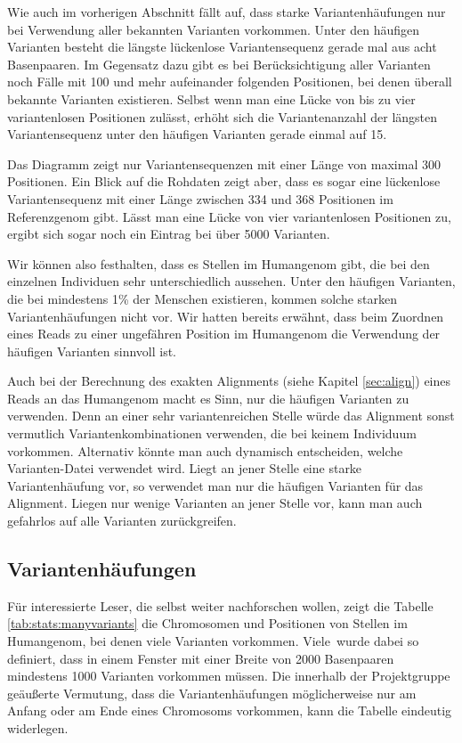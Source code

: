 Wie auch im vorherigen Abschnitt fällt auf, dass starke Variantenhäufungen nur bei Verwendung aller bekannten Varianten vorkommen. Unter den häufigen Varianten besteht die längste lückenlose Variantensequenz gerade mal aus acht Basenpaaren. Im Gegensatz dazu gibt es bei Berücksichtigung aller Varianten noch Fälle mit 100 und mehr aufeinander folgenden Positionen, bei denen überall bekannte Varianten existieren. Selbst wenn man eine Lücke von bis zu vier variantenlosen Positionen zulässt, erhöht sich die Variantenanzahl der längsten Variantensequenz unter den häufigen Varianten gerade einmal auf 15. 

Das Diagramm zeigt nur Variantensequenzen mit einer Länge von maximal 300 Positionen. Ein Blick auf die Rohdaten zeigt aber, dass es sogar eine lückenlose Variantensequenz mit einer Länge zwischen 334 und 368 Positionen im Referenzgenom gibt. Lässt man eine Lücke von vier variantenlosen Positionen zu, ergibt sich sogar noch ein Eintrag bei über 5000 Varianten. 

Wir können also festhalten, dass es Stellen im Humangenom gibt, die bei den einzelnen Individuen sehr unterschiedlich aussehen. Unter den häufigen Varianten, die bei mindestens 1\% der Menschen existieren, kommen solche starken Variantenhäufungen nicht vor. Wir hatten bereits erwähnt, dass beim Zuordnen eines Reads zu einer ungefähren Position im Humangenom die Verwendung der häufigen Varianten sinnvoll ist. 

Auch bei der Berechnung des exakten Alignments (siehe Kapitel \ref{sec:align}) eines Reads an das Humangenom macht es Sinn, nur die häufigen Varianten zu verwenden. Denn an einer sehr variantenreichen Stelle würde das Alignment sonst vermutlich Variantenkombinationen verwenden, die bei keinem Individuum vorkommen. Alternativ könnte man auch dynamisch entscheiden, welche Varianten-Datei verwendet wird. Liegt an jener Stelle eine starke Variantenhäufung vor, so verwendet man nur die häufigen Varianten für das Alignment. Liegen nur wenige Varianten an jener Stelle vor, kann man auch gefahrlos auf alle Varianten zurückgreifen.

\subsection{Variantenhäufungen}
\label{sec:stats:res:manyvariants}

Für interessierte Leser, die selbst weiter nachforschen wollen, zeigt die Tabelle \ref{tab:stats:manyvariants} die Chromosomen und Positionen von Stellen im Humangenom, bei denen viele Varianten vorkommen. \glqq Viele\grqq\ wurde dabei so definiert, dass in einem Fenster mit einer Breite von 2000 Basenpaaren mindestens 1000 Varianten vorkommen müssen. Die innerhalb der Projektgruppe geäußerte Vermutung, dass die Variantenhäufungen möglicherweise nur am Anfang oder am Ende eines Chromosoms vorkommen, kann die Tabelle eindeutig widerlegen.

